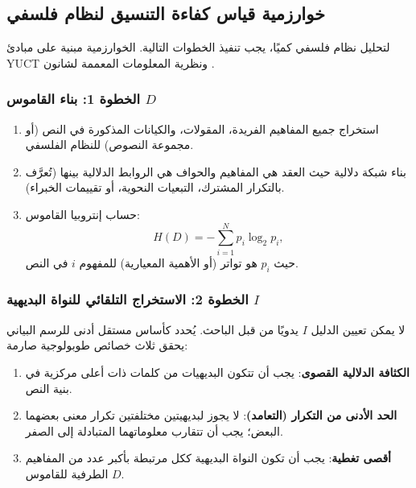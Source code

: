 \documentclass[11pt,a4paper]{article}
\begin{document}
	\subsection{خوارزمية قياس كفاءة التنسيق لنظام فلسفي}
	\label{subsec:measurement-algorithm}
	
	لتحليل نظام فلسفي كميًا، يجب تنفيذ الخطوات التالية. الخوارزمية مبنية على مبادئ YUCT ونظرية المعلومات المعممة لشانون \cite{AppendixX}.
	
	\subsubsection{الخطوة 1: بناء القاموس \(D\)}
	
	\begin{enumerate}
		\item استخراج جميع المفاهيم الفريدة، المقولات، والكيانات المذكورة في النص (أو مجموعة النصوص) للنظام الفلسفي.
		\item بناء شبكة دلالية حيث العقد هي المفاهيم والحواف هي الروابط الدلالية بينها (تُعرَّف بالتكرار المشترك، التبعيات النحوية، أو تقييمات الخبراء).
		\item حساب إنتروبيا القاموس:
		\[
		H(D) = -\sum_{i=1}^{N} p_i \log_2 p_i,
		\]
		حيث \(p_i\) هو تواتر (أو الأهمية المعيارية) للمفهوم \(i\) في النص.
	\end{enumerate}
	
	\subsubsection{الخطوة 2: الاستخراج التلقائي للنواة البديهية \(I\)}
	\label{sec:auto-basis}
	
	لا يمكن تعيين الدليل \(I\) يدويًا من قبل الباحث. يُحدد كأساس مستقل أدنى للرسم البياني يحقق ثلاث خصائص طوبولوجية صارمة:
	\begin{enumerate}
		\item \textbf{الكثافة الدلالية القصوى}: يجب أن تتكون البديهيات من كلمات ذات أعلى مركزية في بنية النص.
		\item \textbf{الحد الأدنى من التكرار (التعامد)}: لا يجوز لبديهيتين مختلفتين تكرار معنى بعضهما البعض؛ يجب أن تتقارب معلوماتهما المتبادلة إلى الصفر.
		\item \textbf{أقصى تغطية}: يجب أن تكون النواة البديهية ككل مرتبطة بأكبر عدد من المفاهيم الطرفية للقاموس \(D\).
	\end{enumerate}
	
\end{document}
